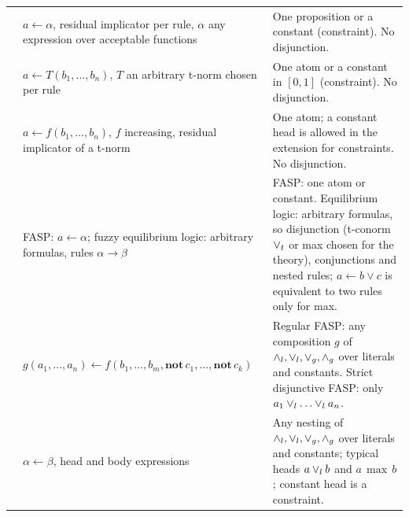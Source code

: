 {\begin{longtable}{@{}p{}p{}p{}@{}}
            \cite{JanssenSVD09}                   & $a\leftarrow\alpha$, residual implicator per rule, $\alpha$ any expression over acceptable functions                                                    & One proposition or a constant (constraint). No disjunction.                                                                                                                                                                         \\
            \cite{JanssenVSD12}                   & $a\leftarrow T(b_1,\dots,b_n)$, $T$ an arbitrary t-norm chosen per rule                                                                                 & One atom or a constant in $[0,1]$ (constraint). No disjunction.                                                                                                                                                                     \\
            \cite{JanssenSVD12core}               & $a\leftarrow f(b_1,\dots,b_n)$, $f$ increasing, residual implicator of a t-norm                                                                         & One atom; a constant head is allowed in the extension for constraints. No disjunction.                                                                                                                                              \\
            \cite{SchockaertJVD09,SchockaertJV12} & FASP: $a\leftarrow\alpha$; fuzzy equilibrium logic: arbitrary formulas, rules $\alpha\to\beta$                                                          & FASP: one atom or constant. Equilibrium logic: arbitrary formulas, so disjunction (t-conorm $\lor_t$ or max chosen for the theory), conjunctions and nested rules; $a\leftarrow b\lor c$ is equivalent to two rules only for max. \\
            \cite{BlondeelSVD14}                  & $g(a_1,\dots,a_n)\leftarrow f(b_1,\dots,b_m,\mathbf{not}\,c_1,\dots,\mathbf{not}\,c_k)$                                                                 & Regular FASP: any composition $g$ of $\land_l,\lor_l,\lor_g,\land_g$ over literals and constants. Strict disjunctive FASP: only $a_1\flpor_l\dots\flpor_l a_n$.                                                             \\
            \cite{MushthofaSD14}                  & $\alpha\leftarrow\beta$, head and body expressions                                                                                                      & Any nesting of $\land_l,\lor_l,\lor_g,\land_g$ over literals and constants; typical heads $a\lor_l b$ and $a\,\max\,b$; constant head is a constraint.                                                                    \\

\end{longtable}}
